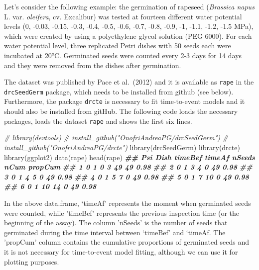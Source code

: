\documentclass[
]{book}
\newenvironment{Shaded}{\begin{snugshade}}{\end{snugshade}}
\newcommand{\CommentTok}[1]{\textcolor[rgb]{0.56,0.35,0.01}{\textit{#1}}}
\newcommand{\DocumentationTok}[1]{\textcolor[rgb]{0.56,0.35,0.01}{\textbf{\textit{#1}}}}
\newcommand{\FunctionTok}[1]{\textcolor[rgb]{0.00,0.00,0.00}{#1}}
\newcommand{\NormalTok}[1]{#1}
\begin{document}
Let's consider the following example: the germination of rapeseed (\emph{Brassica napus} L. var. \emph{oleifera}, cv. Excalibur) was tested at fourteen different water potential levels (0, -0.03, -0.15, -0.3, -0.4, -0.5, -0.6, -0.7, -0.8, -0.9, -1, -1.1, -1.2, -1.5 MPa), which were created by using a polyethylene glycol solution (PEG 6000). For each water potential level, three replicated Petri dishes with 50 seeds each were incubated at 20°C. Germinated seeds were counted every 2-3 days for 14 days and they were removed from the dishes after germination.

The dataset was published by Pace et al.~(2012) and it is available as \texttt{rape} in the \texttt{drcSeedGerm} package, which needs to be installed from github (see below). Furthermore, the package \texttt{drcte} is necessary to fit time-to-event models and it should also be installed from gitHub. The following code loads the necessary packages, loads the dataset \texttt{rape} and shows the first six lines.

\begin{Shaded}
\begin{Highlighting}[]
\CommentTok{\# library(devtools)}
\CommentTok{\# install\_github("OnofriAndreaPG/drcSeedGerm")}
\CommentTok{\# install\_github("OnofriAndreaPG/drcte")}
\FunctionTok{library}\NormalTok{(drcSeedGerm)}
\FunctionTok{library}\NormalTok{(drcte)}
\FunctionTok{library}\NormalTok{(ggplot2)}
\FunctionTok{data}\NormalTok{(rape)}
\FunctionTok{head}\NormalTok{(rape)}
\DocumentationTok{\#\#   Psi Dish timeBef timeAf nSeeds nCum propCum}
\DocumentationTok{\#\# 1   0    1       0      3     49   49    0.98}
\DocumentationTok{\#\# 2   0    1       3      4      0   49    0.98}
\DocumentationTok{\#\# 3   0    1       4      5      0   49    0.98}
\DocumentationTok{\#\# 4   0    1       5      7      0   49    0.98}
\DocumentationTok{\#\# 5   0    1       7     10      0   49    0.98}
\DocumentationTok{\#\# 6   0    1      10     14      0   49    0.98}
\end{Highlighting}
\end{Shaded}

In the above data.frame, `timeAf' represents the moment when germinated seeds were counted, while 'timeBef' represents the previous inspection time (or the beginning of the assay). The column 'nSeeds' is the number of seeds that germinated during the time interval between `timeBef' and `timeAf. The 'propCum' column contains the cumulative proportions of germinated seeds and it is not necessary for time-to-event model fitting, although we can use it for plotting purposes.
\end{document}
